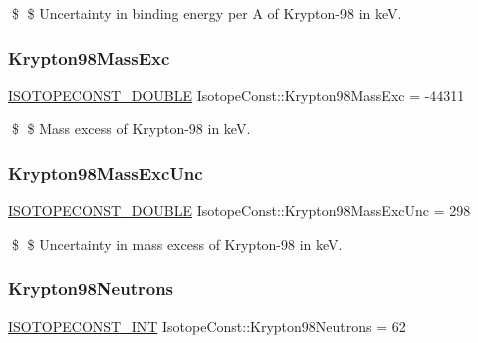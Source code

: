 \$ \$ Uncertainty in binding energy per A of Krypton-\/98 in keV. \mbox{\label{group___isotope_const-_krypton-_kr98_ga25786e6429fde25f303428bed7cec68e}} 
\subsubsection{\texorpdfstring{Krypton98\+Mass\+Exc}{Krypton98MassExc}}
{\footnotesize\ttfamily \mbox{\hyperlink{group___isotope_const-_macros_ga8f45a7272ce02c0b4c65c44636ed719a}{I\+S\+O\+T\+O\+P\+E\+C\+O\+N\+S\+T\+\_\+\+D\+O\+U\+B\+LE}} Isotope\+Const\+::\+Krypton98\+Mass\+Exc = -\/44311}

\$ \$ Mass excess of Krypton-\/98 in keV. \mbox{\label{group___isotope_const-_krypton-_kr98_ga3a8fa5064a09c2a6c4d280b677bbf44a}} 
\subsubsection{\texorpdfstring{Krypton98\+Mass\+Exc\+Unc}{Krypton98MassExcUnc}}
{\footnotesize\ttfamily \mbox{\hyperlink{group___isotope_const-_macros_ga8f45a7272ce02c0b4c65c44636ed719a}{I\+S\+O\+T\+O\+P\+E\+C\+O\+N\+S\+T\+\_\+\+D\+O\+U\+B\+LE}} Isotope\+Const\+::\+Krypton98\+Mass\+Exc\+Unc = 298}

\$ \$ Uncertainty in mass excess of Krypton-\/98 in keV. \mbox{\label{group___isotope_const-_krypton-_kr98_ga21d2309af95831db26c6d30a401f00db}} 
\subsubsection{\texorpdfstring{Krypton98\+Neutrons}{Krypton98Neutrons}}
{\footnotesize\ttfamily \mbox{\hyperlink{group___isotope_const-_macros_ga5f18360b3e99483a35c32d789e62621c}{I\+S\+O\+T\+O\+P\+E\+C\+O\+N\+S\+T\+\_\+\+I\+NT}} Isotope\+Const\+::\+Krypton98\+Neutrons = 62}

